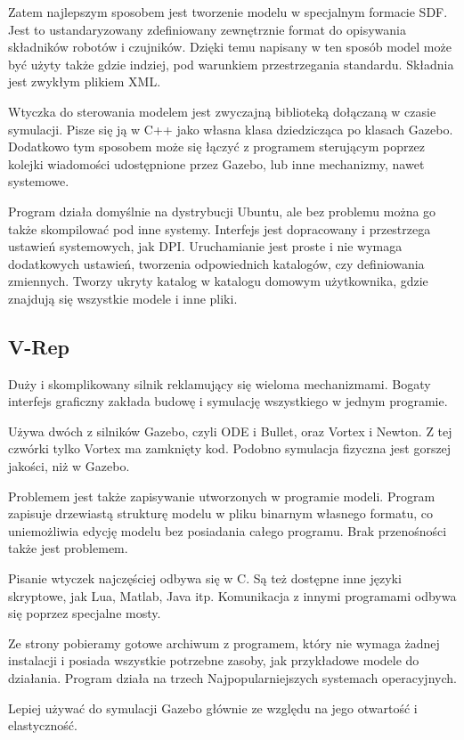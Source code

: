 Zatem najlepszym sposobem jest tworzenie modelu w specjalnym formacie SDF. Jest to ustandaryzowany zdefiniowany zewnętrznie format do opisywania składników robotów i czujników.
Dzięki temu napisany w ten sposób model może być użyty także gdzie indziej, pod warunkiem przestrzegania standardu.
Składnia jest zwykłym plikiem XML.

Wtyczka do sterowania modelem jest zwyczajną biblioteką dołączaną w czasie symulacji. 
Pisze się ją w C++ jako własna klasa dziedzicząca po klasach Gazebo.
Dodatkowo tym sposobem może się łączyć z programem sterującym poprzez kolejki wiadomości udostępnione przez Gazebo, lub inne mechanizmy, nawet systemowe.

Program działa domyślnie na dystrybucji Ubuntu, ale bez problemu można go także skompilować pod inne systemy.
Interfejs jest dopracowany i przestrzega ustawień systemowych, jak DPI.
Uruchamianie jest proste i nie wymaga dodatkowych ustawień, tworzenia odpowiednich katalogów, czy definiowania zmiennych.
Tworzy ukryty katalog w katalogu domowym użytkownika, gdzie znajdują się wszystkie modele i inne pliki.

\subsection{V-Rep}
Duży i skomplikowany silnik reklamujący się wieloma mechanizmami.
Bogaty interfejs graficzny zakłada budowę i symulację wszystkiego w jednym programie.

Używa dwóch z silników Gazebo, czyli ODE i Bullet, oraz Vortex i Newton. Z tej czwórki tylko Vortex ma zamknięty kod.
Podobno symulacja fizyczna jest gorszej jakości, niż w Gazebo.

Problemem jest także zapisywanie utworzonych w programie modeli.
Program zapisuje drzewiastą strukturę modelu w pliku binarnym własnego formatu, co uniemożliwia edycję modelu bez posiadania całego programu.
Brak przenośności także jest problemem.

Pisanie wtyczek najczęściej odbywa się w C. Są też dostępne inne języki skryptowe, jak Lua, Matlab, Java itp.
Komunikacja z innymi programami odbywa się poprzez specjalne mosty.

Ze strony pobieramy gotowe archiwum z programem, który nie wymaga żadnej instalacji i posiada wszystkie potrzebne zasoby, jak przykładowe modele do działania.
Program działa na trzech Najpopularniejszych systemach operacyjnych.

Lepiej używać do symulacji Gazebo głównie ze względu na jego otwartość i elastyczność.

